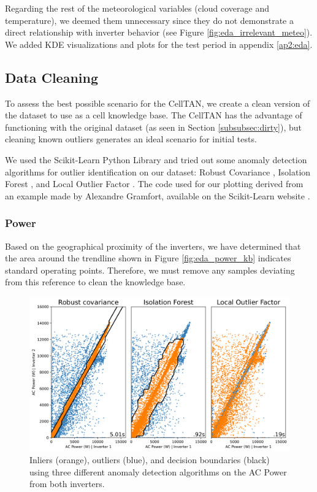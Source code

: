 Regarding the rest of the meteorological variables (cloud coverage and temperature), we deemed them unnecessary since they do not demonstrate a direct relationship with inverter behavior (see Figure \ref{fig:eda_irrelevant_meteo}). We added KDE visualizations and plots for the test period in appendix \ref{ap2:eda}.

\subsection{Data Cleaning}

To assess the best possible scenario for the CellTAN, we create a clean version of the dataset to use as a cell knowledge base. The CellTAN has the advantage of functioning with the original dataset (as seen in Section \ref{subsubsec:dirty}), but cleaning known outliers generates an ideal scenario for initial tests.

We used the Scikit-Learn Python Library and tried out some anomaly detection algorithms for outlier identification on our dataset: Robust Covariance \cite{Rousseeuw1999}, Isolation Forest \cite{Liu2008} \cite{Liu2012}, and Local Outlier Factor \cite{Breunig2000}. The code used for our plotting derived from an example made by Alexandre Gramfort, available on the Scikit-Learn website \cite{sklearn_example}.

\subsubsection{Power}

Based on the geographical proximity of the inverters, we have determined that the area around the trendline shown in Figure \ref{fig:eda_power_kb} indicates standard operating points. Therefore, we must remove any samples deviating from this reference to clean the knowledge base.

\begin{figure}[h!]
    \centering
    \includegraphics[width=\textwidth]{figures/chapter5/cleaning/20_cleaning_power-1.png}
    \caption{Inliers (orange), outliers (blue), and decision boundaries (black) using three different anomaly detection algorithms on the AC Power from both inverters.}
    \label{fig:clean_power}
\end{figure}

